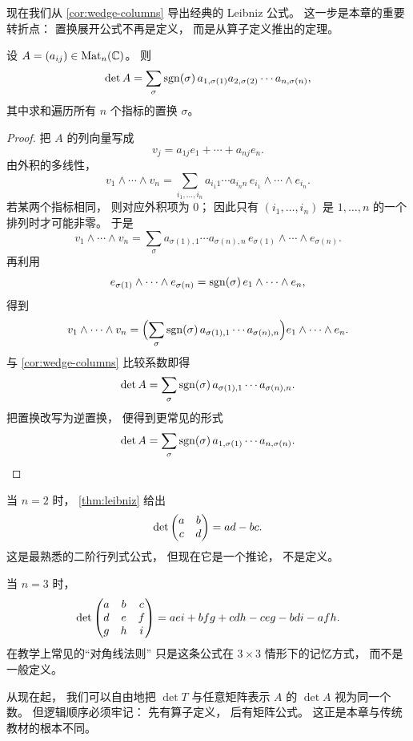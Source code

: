 现在我们从 \cref{cor:wedge-columns} 导出经典的 Leibniz 公式。 这一步是本章的重要转折点： 置换展开公式不再是定义， 而是从算子定义推出的定理。




\begin{theorem}[置换展开公式]\label{thm:leibniz} 设 \(A=(a_{ij})\in \mathrm{Mat}_n(\mathbb{C})\)。 则 \[ \det A = \sum_{\sigma} \operatorname{sgn}(\sigma)\, a_{1,\sigma(1)}a_{2,\sigma(2)}\cdots a_{n,\sigma(n)}, \] 其中求和遍历所有 \(n\) 个指标的置换 \(\sigma\)。 \end{theorem}




\begin{proof} 把 \(A\) 的列向量写成 \[ v_j=a_{1j}e_1+\cdots+a_{nj}e_n. \] 由外积的多线性， \[ v_1\wedge\cdots\wedge v_n = \sum_{i_1,\dots,i_n} a_{i_1 1}\cdots a_{i_n n}\, e_{i_1}\wedge\cdots\wedge e_{i_n}. \] 若某两个指标相同， 则对应外积项为 \(0\)； 因此只有 \((i_1,\dots,i_n)\) 是 \(1,\dots,n\) 的一个排列时才可能非零。 于是 \[ v_1\wedge\cdots\wedge v_n = \sum_{\sigma} a_{\sigma(1),1}\cdots a_{\sigma(n),n}\, e_{\sigma(1)}\wedge\cdots\wedge e_{\sigma(n)}. \] 再利用 \[ e_{\sigma(1)}\wedge\cdots\wedge e_{\sigma(n)} = \operatorname{sgn}(\sigma)\,e_1\wedge\cdots\wedge e_n, \] 得到 \[ v_1\wedge\cdots\wedge v_n = \Bigl( \sum_{\sigma} \operatorname{sgn}(\sigma)\, a_{\sigma(1),1}\cdots a_{\sigma(n),n} \Bigr)e_1\wedge\cdots\wedge e_n. \] 与 \cref{cor:wedge-columns} 比较系数即得 \[ \det A = \sum_{\sigma} \operatorname{sgn}(\sigma)\, a_{\sigma(1),1}\cdots a_{\sigma(n),n}. \] 把置换改写为逆置换， 便得到更常见的形式 \[ \det A = \sum_{\sigma} \operatorname{sgn}(\sigma)\, a_{1,\sigma(1)}\cdots a_{n,\sigma(n)}. \] \end{proof}




\begin{example} 当 \(n=2\) 时， \cref{thm:leibniz} 给出 \[ \det\begin{pmatrix} a&b\\c&d \end{pmatrix}=ad-bc. \] 这是最熟悉的二阶行列式公式， 但现在它是一个推论， 不是定义。 \end{example}




\begin{example} 当 \(n=3\) 时， \[ \det\begin{pmatrix}  a&b&c\\ d&e&f\\ g&h&i \end{pmatrix} = aei+bfg+cdh-ceg-bdi-afh. \] 在教学上常见的“对角线法则” 只是这条公式在 \(3\times3\) 情形下的记忆方式， 而不是一般定义。 \end{example}




\begin{remark} 从现在起， 我们可以自由地把 \(\det T\) 与任意矩阵表示 \(A\) 的 \(\det A\) 视为同一个数。 但逻辑顺序必须牢记： 先有算子定义， 后有矩阵公式。 这正是本章与传统教材的根本不同。 \end{remark}




